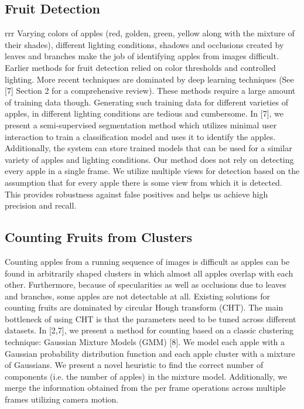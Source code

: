 \subsection{Fruit Detection}rrr
Varying colors of apples (red, golden, green, yellow along with the mixture of their shades), different lighting conditions, shadows and occlusions created by leaves and branches make the job of identifying apples from images difficult. Earlier methods for fruit detection relied on color thresholds and controlled lighting. More recent techniques are dominated by deep learning techniques (See [7] Section 2 for a comprehensive review). These methods require a large amount of training data though. Generating such training data for different varieties of apples, in different lighting conditions are tedious and cumbersome.  In [7], we present a semi-supervised segmentation method which utilizes minimal user interaction to train a classification model and uses it to identify the apples. Additionally, the system can store trained models that can be used for a similar variety of apples and lighting conditions. Our method does not rely on detecting every apple in a single frame. We utilize multiple views for detection based on the assumption that for every apple there is some view from which it is detected. This provides robustness against false positives and helps us achieve high precision and recall.

\subsection{Counting Fruits from Clusters}
Counting apples from a running sequence of images is difficult as apples can be found in arbitrarily shaped clusters in which almost all apples overlap with each other. Furthermore, because of specularities as well as occlusions due to leaves and branches, some apples are not detectable at all. Existing solutions for counting fruits are dominated by circular Hough transform (CHT). The main bottleneck of using CHT is that the parameters need to be tuned across different datasets.  In [2,7], we present a method for counting based on a classic clustering technique: Gaussian Mixture Models (GMM) [8]. We model each apple with a Gaussian probability distribution function and each apple cluster with a mixture of Gaussians. We present a novel heuristic to find the correct number of components (i.e. the number of apples) in the mixture model. Additionally, we merge the information obtained from the per frame operations across multiple frames utilizing camera motion.\\

